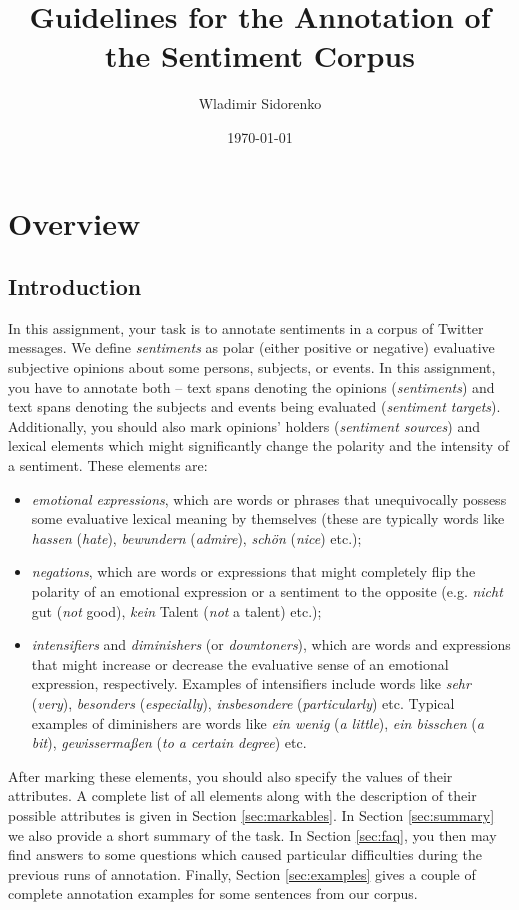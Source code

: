 \documentclass[11pt,a4paper]{article}
\author{Wladimir Sidorenko}
\date{\today}
\title{Guidelines for the Annotation of the Sentiment Corpus}
\theoremstyle{mytheoremstyle}
\begin{document}
\maketitle{}
\section{Overview}
\subsection{Introduction}

In this assignment, your task is to annotate sentiments in a corpus of
Twitter messages.  We define \emph{sentiments} as polar (either
positive or negative) evaluative subjective opinions about some
persons, subjects, or events.  In this assignment, you have to
annotate both -- text spans denoting the opinions (\emph{sentiments})
and text spans denoting the subjects and events being evaluated
(\emph{sentiment targets}).  Additionally, you should also mark
opinions' holders (\emph{sentiment sources}) and lexical elements
which might significantly change the polarity and the intensity of a
sentiment.  These elements are:
\begin{itemize}
  \item \emph{emotional expressions}, which are words or phrases that
    unequivocally possess some evaluative lexical meaning by
    themselves (these are typically words like \emph{hassen}
    (\emph{hate}), \emph{bewundern} (\emph{admire}), \emph{sch\"on}
    (\emph{nice}) etc.);
  \item \emph{negations}, which are words or expressions that might
    completely flip the polarity of an emotional expression or a
    sentiment to the opposite (e.g. \emph{nicht} gut (\emph{not}
    good), \emph{kein} Talent (\emph{not} a talent) etc.);
  \item \emph{intensifiers} and \emph{diminishers} (or
    \emph{downtoners}), which are words and expressions that might
    increase or decrease the evaluative sense of an emotional
    expression, respectively.  Examples of intensifiers include words
    like \emph{sehr} (\emph{very}), \emph{besonders}
    (\emph{especially}), \emph{insbesondere} (\emph{particularly})
    etc.  Typical examples of diminishers are words like \emph{ein
      wenig} (\emph{a little}), \emph{ein bisschen} (\emph{a bit}),
    \emph{gewisserma\ss{}en} (\emph{to a certain degree}) etc.
\end{itemize}

After marking these elements, you should also specify the values of
their attributes.  A complete list of all elements along with the
description of their possible attributes is given in Section
\ref{sec:markables}.  In Section \ref{sec:summary} we also provide a
short summary of the task.  In Section \ref{sec:faq}, you then may
find answers to some questions which caused particular difficulties
during the previous runs of annotation.  Finally, Section
\ref{sec:examples} gives a couple of complete annotation examples for
some sentences from our corpus.
\end{document}
